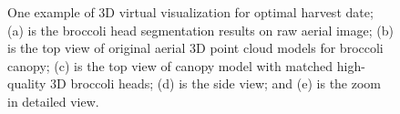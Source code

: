 \begin{figure}[htb!]
  \begin{center}
  \end{center}
  \caption[One example of 3D virtual visualization for optimal harvest date]{
    One example of 3D virtual visualization for optimal harvest date; (a) is the broccoli head segmentation results on raw aerial image; (b) is the top view of original aerial 3D point cloud models for broccoli canopy; (c) is the top view of canopy model with matched high-quality 3D broccoli heads; (d) is the side view; and (e) is the zoom in detailed view.
  }
  \label{fig:xrs6}
\end{figure}